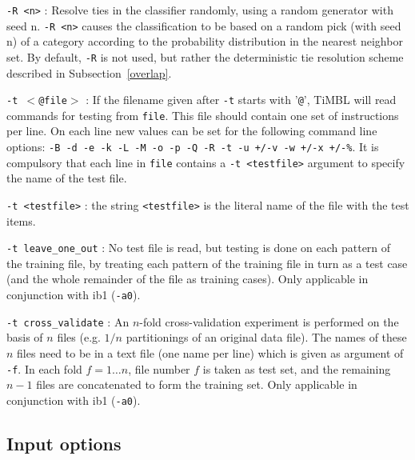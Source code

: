 \documentclass{report}
\begin{document}
\begin{description}
\item {\tt -R <n>} : Resolve ties in the classifier randomly, using a
random generator with seed n. {\tt -R <n>} causes the classification
to be based on a random pick (with seed n) of a category according to
the probability distribution in the nearest neighbor set. By default,
{\tt -R} is not used, but rather the deterministic tie resolution
scheme described in Subsection~\ref{overlap}.

\item {\tt -t $<$@file$>$} : If the filename given after {\tt -t} starts
with '{\tt @}', TiMBL will read commands for testing from {\tt file}.
This file should contain one set of instructions per line. On each
line new values can be set for the following command line options:
{\tt -B -d -e -k -L -M -o -p -Q -R -t -u +/-v -w +/-x +/-\%}. It is
compulsory that each line in {\tt file} contains a {\tt -t <testfile>}
argument to specify the name of the test file.

\item {\tt -t <testfile>} : the string {\tt <testfile>} is the literal name
of the file with the test items.

\item {\tt -t leave\_one\_out} : No test file is read, but testing is
done on each pattern of the training file, by treating each pattern of
the training file in turn as a test case (and the whole remainder of
the file as training cases). Only applicable in conjunction with {\sc ib1} ({\tt -a0}).

\item {\tt -t cross\_validate} : An $n$-fold cross-validation
experiment is performed on the basis of $n$ files (e.g. $1/n$
partitionings of an original data file). The names of these $n$ files
need to be in a text file (one name per line) which is given as
argument of {\tt -f}. In each fold $f=1 \ldots n$, file number $f$ is
taken as test set, and the remaining $n-1$ files are concatenated to
form the training set. Only applicable in conjunction with {\sc ib1} ({\tt -a0}).

\end{description}

\subsection{Input options}
\end{document}
